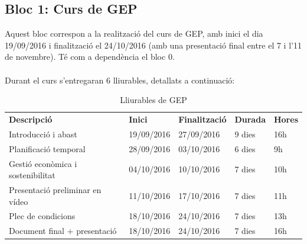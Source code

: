 	\subsection{Bloc 1: Curs de GEP}
		Aquest bloc correspon a la realització del curs de GEP, amb inici el dia 19/09/2016 i finalització el 24/10/2016 (amb una presentació final entre el 7 i l'11 de novembre).
		Té com a dependència el bloc 0.\\\\
		Durant el curs s'entregaran 6 lliurables, detallats a continuació:\\
		\begin{table}[H]
			\begin{center}
				\begin{tabular}{p{5cm} !{\vrule width -1pt}l !{\vrule width -1pt}l !{\vrule width -1pt}l !{\vrule width -1pt}l }
				\textbf{Descripció} & \textbf{Inici} & \textbf{Finalització} & \textbf{Durada} & \textbf{Hores} \\
				Introducció i abast & 19/09/2016 & 27/09/2016 & 9 dies & 16h \\
				Planificació temporal & 28/09/2016 & 03/10/2016 & 6 dies & 9h \\
				Gestió econòmica i sostenibilitat & 04/10/2016 & 10/10/2016 & 7 dies & 10h \\
				Presentació preliminar en vídeo & 11/10/2016 & 17/10/2016 & 7 dies & 11h \\
				Plec de condicions & 18/10/2016 & 24/10/2016 & 7 dies & 13h \\
				Document final + presentació & 18/10/2016 & 24/10/2016 & 7 dies & 16h
				\end{tabular}
			\end{center}
			\caption{Lliurables de GEP}
		\end{table}

